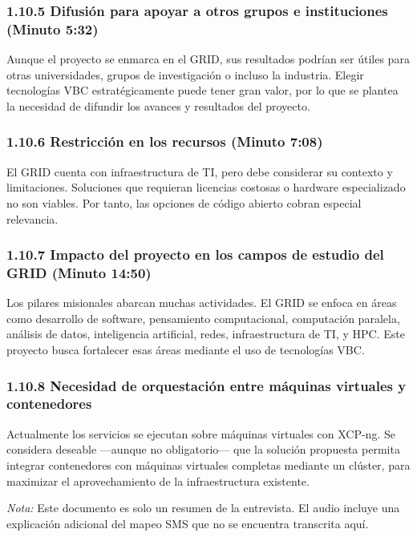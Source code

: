 \subsubsection*{1.10.5 Difusión para apoyar a otros grupos e instituciones (Minuto 5:32)}
Aunque el proyecto se enmarca en el GRID, sus resultados podrían ser útiles para otras universidades, grupos de investigación o incluso la industria. Elegir tecnologías VBC estratégicamente puede tener gran valor, por lo que se plantea la necesidad de difundir los avances y resultados del proyecto.

\subsubsection*{1.10.6 Restricción en los recursos (Minuto 7:08)}
El GRID cuenta con infraestructura de TI, pero debe considerar su contexto y limitaciones. Soluciones que requieran licencias costosas o hardware especializado no son viables. Por tanto, las opciones de código abierto cobran especial relevancia.

\subsubsection*{1.10.7 Impacto del proyecto en los campos de estudio del GRID (Minuto 14:50)}
Los pilares misionales abarcan muchas actividades. El GRID se enfoca en áreas como desarrollo de software, pensamiento computacional, computación paralela, análisis de datos, inteligencia artificial, redes, infraestructura de TI, y HPC. Este proyecto busca fortalecer esas áreas mediante el uso de tecnologías VBC.

\subsubsection*{1.10.8 Necesidad de orquestación entre máquinas virtuales y contenedores}
Actualmente los servicios se ejecutan sobre máquinas virtuales con XCP-ng. Se considera deseable —aunque no obligatorio— que la solución propuesta permita integrar contenedores con máquinas virtuales completas mediante un clúster, para maximizar el aprovechamiento de la infraestructura existente.

\bigskip
\noindent \textit{Nota:} Este documento es solo un resumen de la entrevista. El audio incluye una explicación adicional del mapeo SMS que no se encuentra transcrita aquí.